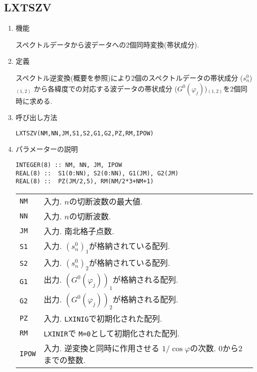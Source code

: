 \documentclass[a4j]{jarticle}
\begin{document}

\subsection{LXTSZV}

\begin{enumerate}

\item 機能 

スペクトルデータから波データへの2個同時変換(帯状成分).

\item 定義

スペクトル逆変換(概要を参照)により2個のスペクトルデータの帯状成分
($s^0_n$)$_{(1,2)}$
から各緯度での対応する波データの帯状成分
($G^0(\varphi_j)$)$_{(1,2)}$を2個同時に求める.

\item 呼び出し方法 

\texttt{LXTSZV(NM,NN,JM,S1,S2,G1,G2,PZ,RM,IPOW)}
  
\item パラメーターの説明

\begin{verbatim}  
INTEGER(8) :: NM, NN, JM, IPOW
REAL(8) ::  S1(0:NN), S2(0:NN), G1(JM), G2(JM)
REAL(8) ::  PZ(JM/2,5), RM(NM/2*3+NM+1)
\end{verbatim}  

\begin{tabular}{ll}
\texttt{NM} & 入力. $n$の切断波数の最大値.\\
\texttt{NN} & 入力. $n$の切断波数.\\
\texttt{JM} & 入力. 南北格子点数.\\
\texttt{S1} & 入力. $(s^0_n)_1$が格納されている配列.\\
\texttt{S2} & 入力. $(s^0_n)_2$が格納されている配列.\\
\texttt{G1} & 出力. $(G^0(\varphi_j))_1$が格納される配列.\\
\texttt{G2} & 出力. $(G^0(\varphi_j))_2$が格納される配列.\\
\texttt{PZ}  & 入力. \texttt{LXINIG}で初期化された配列.\\
\texttt{RM}  & \texttt{LXINIR}で \texttt{M=0}として初期化された配列.\\
\texttt{IPOW} & 入力. 逆変換と同時に作用させる
                      $1/\cos\varphi$の次数. 0から2までの整数.
\end{tabular}


\end{enumerate}
\end{document}
